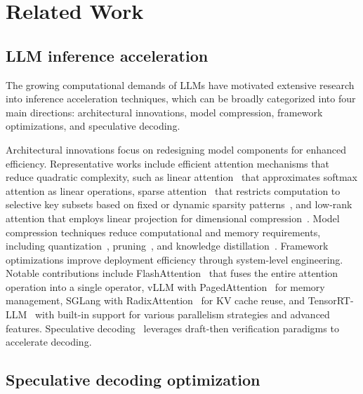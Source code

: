 \documentclass{article} %
\begin{document}
\section{Related Work}

\subsection{LLM inference acceleration} 

The growing computational demands of LLMs have motivated extensive research into inference acceleration techniques, which can be broadly categorized into four main directions: architectural innovations, model compression, framework optimizations, and speculative decoding. 

Architectural innovations focus on redesigning model components for enhanced efficiency. Representative works include efficient attention mechanisms that reduce quadratic complexity, such as linear attention~\citep{katharopoulos2020transformers,yang2025parallelizing,yang2024gated} that approximates softmax attention as linear operations, sparse attention~\citep{child2019generating,lu2025moba} that restricts computation to selective key subsets based on fixed or dynamic sparsity patterns~\citep{sun2025efficient}, and low-rank attention that employs linear projection for dimensional compression~\citep{deepseek-ai2024deepseekv2}. Model compression techniques reduce computational and memory requirements, including quantization~\citep{frantar2023gptq,lin2024awq,dettmers2022llmint8,xiao2024smoothquant}, pruning~\citep{frantar2023sparsegpt,sun2024simple,ma2023llmpruner}, and knowledge distillation~\citep{gu2024minillm,hsieh2023distilling,ho2023large}. Framework optimizations improve deployment efficiency through system-level engineering. Notable contributions include FlashAttention~\citep{dao2022flashattention,dao2023flashattention2,shah2024flashattention3} that fuses the entire attention operation into a single operator, vLLM with PagedAttention~\citep{kwon2023efficient} for memory management, SGLang with RadixAttention~\citep{zheng2024sglang} for KV cache reuse, and TensorRT-LLM~\citep{nvidia2023tensorrtllm} with built-in support for various parallelism strategies and advanced features. Speculative decoding~\citep{leviathan2023fast,chen2023accelerating,stern2018blockwise} leverages draft-then verification paradigms to accelerate decoding.

\subsection{Speculative decoding optimization}
\end{document}
